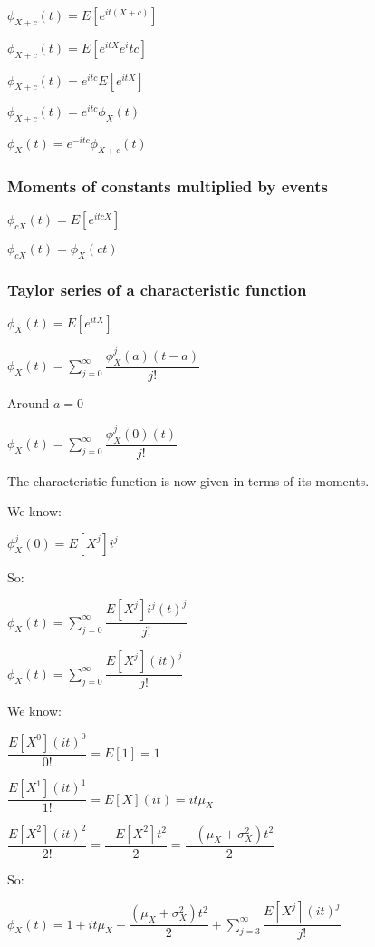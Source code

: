 \(\phi_{X+c}(t)=E[e^{it(X+c)}]\)

\(\phi_{X+c}(t)=E[e^{itX}e^itc]\)

\(\phi_{X+c}(t)=e^{itc}E[e^{itX}]\)

\(\phi_{X+c}(t)=e^{itc}\phi_X(t)\)

\(\phi_{X}(t)=e^{-itc}\phi_{X+c}(t)\)

\subsubsection{Moments of constants multiplied by events}

\(\phi_{cX}(t)=E[e^{itcX}]\)

\(\phi_{cX}(t) = \phi_{X}(ct)\)

\subsubsection{Taylor series of a characteristic function}

\(\phi_X(t)=E[e^{itX}]\)

\(\phi_X(t)=\sum_{j=0}^{\infty }\dfrac{\phi_X^j(a)(t-a)}{j!}\)

Around \(a=0\)

\(\phi_X(t)=\sum_{j=0}^{\infty }\dfrac{\phi_X^j(0)(t)}{j!}\)

The characteristic function is now given in terms of its moments.

We know:

\(\phi_X^j(0)=E[X^j]i^j\)

So:

\(\phi_X(t)=\sum_{j=0}^{\infty }\dfrac{E[X^j]i^j(t)^j}{j!}\)

\(\phi_X(t)=\sum_{j=0}^{\infty }\dfrac{E[X^j](it)^j}{j!}\)

We know:

\(\dfrac{E[X^0](it)^0}{0!}=E[1]=1\)

\(\dfrac{E[X^1](it)^1}{1!}=E[X](it)=it\mu_X \)

\(\dfrac{E[X^2](it)^2}{2!}=\dfrac{-E[X^2]t^2}{2}=\dfrac{-(\mu_X +\sigma_X^2 )t^2}{2}\)

So:

\(\phi_X(t)=1+it\mu_X -\dfrac{(\mu_X +\sigma_X^2 )t^2}{2} +\sum_{j=3}^{\infty }\dfrac{E[X^j](it)^j}{j!}\)


